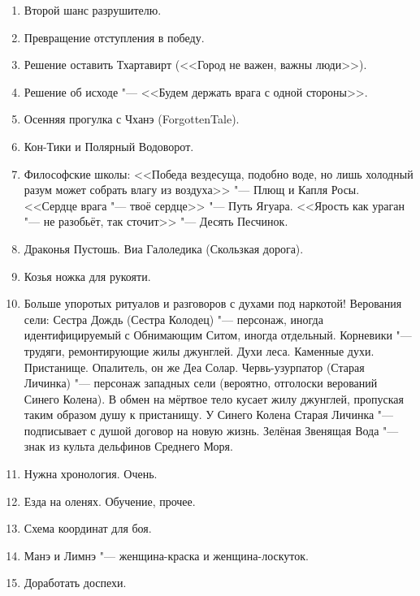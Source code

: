 \begin{enumerate}
\item Второй шанс разрушителю.

\item Превращение отступления в победу.

\item Решение оставить Тхартавирт (<<Город не важен, важны люди>>).

\item Решение об исходе "--- <<Будем держать врага с одной стороны>>.

\item Осенняя прогулка с Чханэ (ForgottenTale).

\item Кон-Тики и Полярный Водоворот.

\item Философские школы: <<Победа вездесуща, подобно воде, но лишь холодный разум может собрать влагу из воздуха>> "--- Плющ и Капля Росы.
<<Сердце врага "--- твоё сердце>> "--- Путь Ягуара.
<<Ярость как ураган "--- не разобьёт, так сточит>> "--- Десять Песчинок.

\item Драконья Пустошь.
Виа Галоледика (Скользкая дорога).

\item Козья ножка для рукояти.

\item Больше упоротых ритуалов и разговоров с духами под наркотой!
Верования сели: Сестра Дождь (Сестра Колодец) "--- персонаж, иногда идентифицируемый с Обнимающим Ситом, иногда отдельный.
Корневики "--- трудяги, ремонтирующие жилы джунглей.
Духи леса.
Каменные духи.
Пристанище.
Опалитель, он же Деа Солар.
Червь-узурпатор (Старая Личинка) "--- персонаж западных сели (вероятно, отголоски верований Синего Колена).
В обмен на мёртвое тело кусает жилу джунглей, пропуская таким образом душу к пристанищу.
У Синего Колена Старая Личинка "--- подписывает с душой договор на новую жизнь.
Зелёная Звенящая Вода "--- знак из культа дельфинов Среднего Моря.

\item Нужна хронология.
Очень.

\item Езда на оленях.
Обучение, прочее.

\item Схема координат для боя.

\item Манэ и Лимнэ "--- женщина-краска и женщина-лоскуток.

\item Доработать доспехи.


\end{enumerate}

